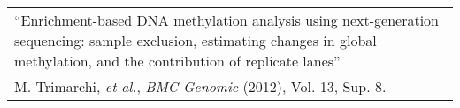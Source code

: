 \begin{tabularx}{\textwidth}{ X }
  ``Enrichment-based DNA methylation analysis using next-generation sequencing:
  sample exclusion, estimating changes in global methylation, and the contribution of replicate lanes'' \\
  \small{M. Trimarchi, \textit{et al.}, \textit{BMC Genomic} (2012), Vol. 13, Sup. 8.} \\
\end{tabularx}
